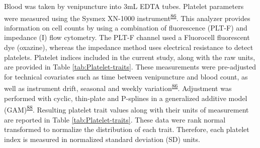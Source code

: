 \documentclass[11pt,twoside]{bristolthesis}
\begin{document}
Blood was taken by venipuncture into 3mL EDTA tubes. Platelet parameters were measured using the Sysmex XN-1000 instrument\textsuperscript{\protect\hyperlink{ref-Astle2016}{86}}. This analyzer provides information on cell counts by using a combination of fluorescence (PLT-F) and impedance (I) flow cytometry. The PLT-F channel used a Fluorocell fluorescent dye (oxazine), whereas the impedance method uses electrical resistance to detect platelets. Platelet indices included in the current study, along with the raw units, are provided in Table \ref{tab:Platelet-traits}. These measurements were pre-adjusted for technical covariates such as time between venipuncture and blood count, as well as instrument drift, seasonal and weekly variation\textsuperscript{\protect\hyperlink{ref-Astle2016}{86}}. Adjustment was performed with cyclic, thin-plate and P-splines in a generalized additive model (GAM)\textsuperscript{\protect\hyperlink{ref-Akbari2020}{88}}. Resulting platelet trait values along with their units of measurement are reported in Table \ref{tab:Platelet-traits}. These data were rank normal transformed to normalize the distribution of each trait. Therefore, each platelet index is measured in normalized standard deviation (SD) units.
\end{document}
